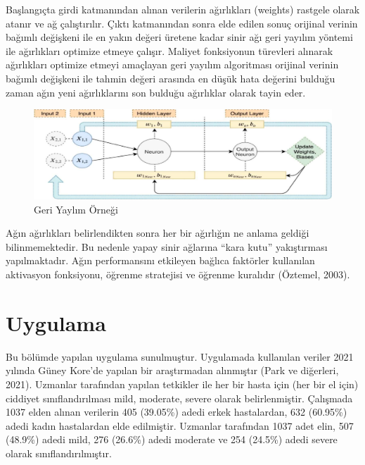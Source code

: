\documentclass[12pt,twoside]{deuthesis}
\begin{document}
Başlangıçta girdi katmanından alınan verilerin ağırlıkları (weights) rastgele olarak atanır ve ağ çalıştırılır. Çıktı katmanından sonra elde edilen sonuç orijinal verinin bağımlı değişkeni ile en yakın değeri üretene kadar sinir ağı geri yayılım yöntemi ile ağırlıkları optimize etmeye çalışır. Maliyet fonksiyonun türevleri alınarak ağırlıkları optimize etmeyi amaçlayan geri yayılım algoritması orijinal verinin bağımlı değişkeni ile tahmin değeri arasında en düşük hata değerini bulduğu zaman ağın yeni ağırlıklarını son bulduğu ağırlıklar olarak tayin eder.
\begin{figure}

{\centering \includegraphics[width=0.85\linewidth,height=0.3\textheight]{figure/geri_yayilim} 

}

\caption{Geri Yaylım Örneği}\label{fig:unnamed-chunk-14}
\end{figure}
Ağın ağırlıkları belirlendikten sonra her bir ağırlığın ne anlama geldiği bilinmemektedir. Bu nedenle yapay sinir ağlarına ``kara kutu'' yakıştırması yapılmaktadır. Ağın performansını etkileyen bağlıca faktörler kullanılan aktivasyon fonksiyonu, öğrenme stratejisi ve öğrenme kuralıdır (Öztemel, 2003).

\hypertarget{uygulama}{%
\chapter{Uygulama}\label{uygulama}}

Bu bölümde yapılan uygulama sunulmuştur. Uygulamada kullanılan veriler 2021 yılında Güney Kore'de yapılan bir araştırmadan alınmıştır (Park ve diğerleri, 2021). Uzmanlar tarafından yapılan tetkikler ile her bir hasta için (her bir el için) ciddiyet sınıflandırılması mild, moderate, severe olarak belirlenmiştir. Çalışmada 1037 elden alınan verilerin 405 (39.05\%) adedi erkek hastalardan, 632 (60.95\%) adedi kadın hastalardan elde edilmiştir. Uzmanlar tarafından 1037 adet elin, 507 (48.9\%) adedi mild, 276 (26.6\%) adedi moderate ve 254 (24.5\%) adedi severe olarak sınıflandırılmıştır.
\end{document}
